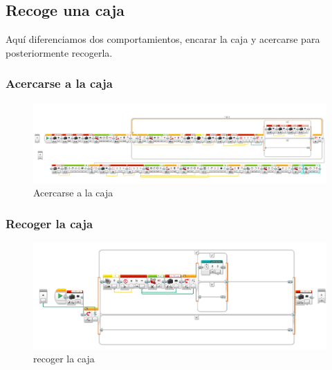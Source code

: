 \documentclass[12pt,a4paper]{article}
\begin{document}
\subsection{Recoge una caja}
Aquí diferenciamos dos comportamientos, encarar la caja y acercarse para posteriormente recogerla.
\subsubsection{Acercarse a la caja}
\begin{figure}[H]
	\caption{Acercarse a la caja}
	\includegraphics[scale=0.45]{RobotLuzMayorCaja.PNG}
	\centering
\end{figure}
\subsubsection{Recoger la caja} 
\begin{figure}[H]
	\caption{recoger la caja}
	\includegraphics[scale=0.45]{RobotCapturarCaja.PNG}
	\centering
\end{figure}
\end{document}
